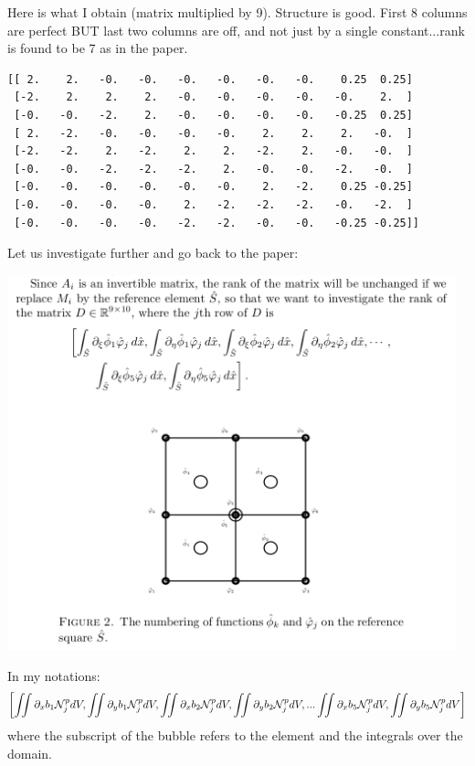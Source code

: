 Here is what I obtain (matrix multiplied by 9). Structure is good.
First 8 columns are perfect BUT last two columns are off, and not just 
by a single constant...rank is found to be 7 as in the paper.

\begin{verbatim}
[[ 2.    2.   -0.   -0.   -0.   -0.   -0.   -0.    0.25  0.25]
 [-2.    2.    2.    2.   -0.   -0.   -0.   -0.   -0.    2.  ]
 [-0.   -0.   -2.    2.   -0.   -0.   -0.   -0.   -0.25  0.25]
 [ 2.   -2.   -0.   -0.   -0.   -0.    2.    2.    2.   -0.  ]
 [-2.   -2.    2.   -2.    2.    2.   -2.    2.   -0.   -0.  ]
 [-0.   -0.   -2.   -2.   -2.    2.   -0.   -0.   -2.   -0.  ]
 [-0.   -0.   -0.   -0.   -0.   -0.    2.   -2.    0.25 -0.25]
 [-0.   -0.   -0.   -0.    2.   -2.   -2.   -2.   -0.   -2.  ]
 [-0.   -0.   -0.   -0.   -2.   -2.   -0.   -0.   -0.25 -0.25]]
\end{verbatim}

Let us investigate further and go back to the paper:
\begin{center}
\includegraphics[width=13cm]{python_codes/fieldstone_72/images/mat4}\\
\end{center}

In my notations:
\[
\left[
\iint \partial_x b_1 {\mathcal{N}}_j^p dV,
\iint \partial_y b_1 {\mathcal{N}}_j^p dV,
\iint \partial_x b_2 {\mathcal{N}}_j^p dV,
\iint \partial_y b_2 {\mathcal{N}}_j^p dV, ...
\iint \partial_x b_5 {\mathcal{N}}_j^p dV,
\iint \partial_y b_5 {\mathcal{N}}_j^p dV
\right]
\]
where the subscript of the bubble refers to the element and the integrals over the domain. 

